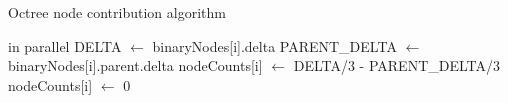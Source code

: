 \documentclass{thesis}
\begin{document}
\begin{algorithm}
    \label{alg:NodeContributions}
    \caption{Octree node contribution algorithm}
    \begin{algorithmic}
         in parallel
                \State DELTA $\gets$ binaryNodes[i].delta
                \State PARENT\_DELTA $\gets$ binaryNodes[i].parent.delta
                \State nodeCounts[i] $\gets$ DELTA/3 - PARENT\_DELTA/3
            \Else
                \State nodeCounts[i] $\gets$ 0
            \EndIf
        \EndFor
    \end{algorithmic}
\end{algorithm}



\end{document}
